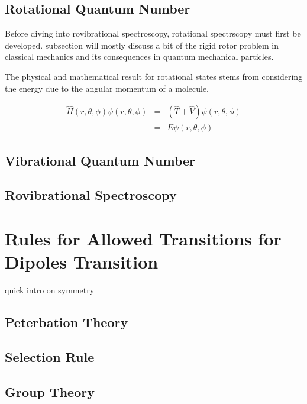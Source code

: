 \documentclass[11pt,a4paper]{book}
\begin{document}
		\subsection{Rotational Quantum Number}
			\label{subsec:Rotational Quantum Number}
			Before diving into rovibrational spectroscopy, rotational spectrscopy must first be developed. subsection will mostly discuss a bit of the rigid rotor problem in classical mechanics and its consequences in quantum mechanical particles. 
			
			The physical and mathematical result for rotational states stems from considering the energy due to the angular momentum of a molecule.
		
			\begin{eqnarray}
				\label{eq:hamiltonian of wavefunction in spherical}
				\hat{H} (r, \theta , \phi) \psi(r, \theta, \phi)
				&=&\left( \hat{T} + \hat{V}\right) \psi(r, \theta, \phi)\\
				&=&E\psi(r, \theta, \phi)
			\end{eqnarray}
			
		\subsection{Vibrational Quantum Number}
			\label{subsec:Vibrational Quantum Number}
		\subsection{Rovibrational Spectroscopy}
			\label{subsec:Rovibrational Spectroscopy}
	\section{Rules for Allowed Transitions for Dipoles Transition}
		\label{sec:Rules for Allowed and Disallowed Transitions}
		quick intro on symmetry
		\subsection{Peterbation Theory}
			\label{subsec:Peterbation Theory}
		\subsection{Selection Rule}
			\label{subsec:Selection Rule}
		\subsection{Group Theory}
			\label{subsec:Group Theory}
		
\end{document}
